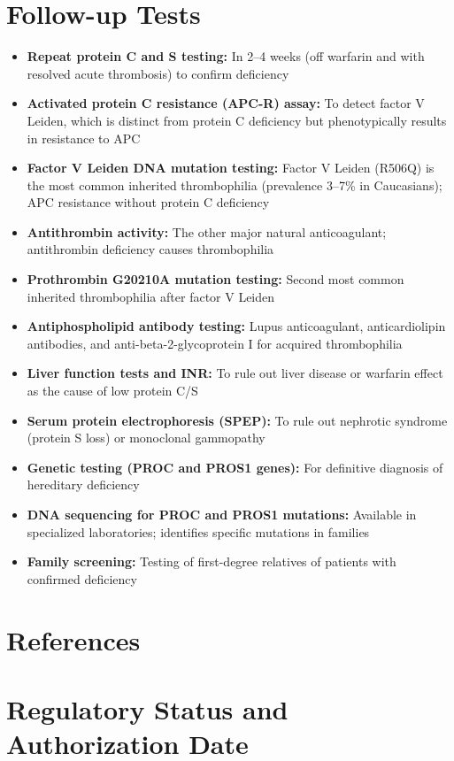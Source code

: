\section*{Follow-up Tests}
\begin{itemize}
  \item \textbf{Repeat protein C and S testing:} In 2--4 weeks (off warfarin and with resolved acute thrombosis) to confirm deficiency
  \item \textbf{Activated protein C resistance (APC-R) assay:} To detect factor V Leiden, which is distinct from protein C deficiency but phenotypically results in resistance to APC
  \item \textbf{Factor V Leiden DNA mutation testing:} Factor V Leiden (R506Q) is the most common inherited thrombophilia (prevalence 3--7\% in Caucasians); APC resistance without protein C deficiency
  \item \textbf{Antithrombin activity:} The other major natural anticoagulant; antithrombin deficiency causes thrombophilia
  \item \textbf{Prothrombin G20210A mutation testing:} Second most common inherited thrombophilia after factor V Leiden
  \item \textbf{Antiphospholipid antibody testing:} Lupus anticoagulant, anticardiolipin antibodies, and anti-beta-2-glycoprotein I for acquired thrombophilia
  \item \textbf{Liver function tests and INR:} To rule out liver disease or warfarin effect as the cause of low protein C/S
  \item \textbf{Serum protein electrophoresis (SPEP):} To rule out nephrotic syndrome (protein S loss) or monoclonal gammopathy
  \item \textbf{Genetic testing (PROC and PROS1 genes):} For definitive diagnosis of hereditary deficiency
  \item \textbf{DNA sequencing for PROC and PROS1 mutations:} Available in specialized laboratories; identifies specific mutations in families
  \item \textbf{Family screening:} Testing of first-degree relatives of patients with confirmed deficiency
\end{itemize}

\section*{References}



\clearpage
\section*{Regulatory Status and Authorization Date}

\clearpage
